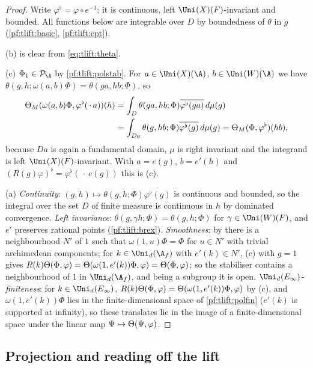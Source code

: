 \begin{proof}
Write $\varphi^\flat=\varphi\circ e^{-1}$; it is continuous, left $\Uni(X)(F)$-invariant and bounded. All functions below are
integrable over $D$ by boundedness of $\theta$ in $g$ (\cref{pf:tlift:basic}, \cref{pf:tlift:cpt}).

(b) is clear from \eqref{eq:tlift:theta}.

(c) $\Phi_1\in\tliftPD$ by \cref{pf:tlift:polstab}. For $a\in\Uni(X)(\A)$, $b\in\Uni(W)(\A)$ we have
$\theta(g,h;\omega(a,b)\Phi)=\theta(ga,hb;\Phi)$, so
\begin{align*}
  \Theta_M(\omega(a,b)\Phi,\varphi^\flat(\,\cdot\,a))(h)&=\int_D\theta(ga,hb;\Phi)\overline{\varphi^\flat(ga)}\,d\mu(g)\\
  &=\int_{Da}\theta(g,hb;\Phi)\overline{\varphi^\flat(g)}\,d\mu(g)=\Theta_M(\Phi,\varphi^\flat)(hb),
\end{align*}
because $Da$ is again a fundamental domain, $\mu$ is right invariant and the integrand is left
$\Uni(X)(F)$-invariant. With $a=e(g)$, $b=e'(h)$ and
$(R(g)\varphi)^\flat=\varphi^\flat(\,\cdot\,e(g))$ this is (c).

(a) \emph{Continuity}: $(g,h)\mapsto\theta(g,h;\Phi)\overline{\varphi^\flat(g)}$ is continuous and bounded, so the integral over the
set $D$ of finite measure is continuous in $h$ by dominated convergence. \emph{Left invariance}: $\theta(g,\gamma h;\Phi)=\theta(g,h;\Phi)$ for
$\gamma\in\Uni(W)(F)$, and $e'$ preserves rational points (\cref{pf:tlift:brex}). \emph{Smoothness}: by
 there is a neighbourhood $N'$ of $1$ such that $\omega(1,u)\Phi=\Phi$ for
$u\in N'$ with trivial archimedean components; for $k\in\Uni_d(\A_f)$ with $e'(k)\in N'$, (c) with $g=1$ gives
$R(k)\Theta(\Phi,\varphi)=\Theta(\omega(1,e'(k))\Phi,\varphi)=\Theta(\Phi,\varphi)$; so the stabiliser contains a
neighbourhood of $1$ in $\Uni_d(\A_f)$, and being a subgroup it is open. \emph{$\Uni_d(E_\infty)$-finiteness}: for
$k\in\Uni_d(E_\infty)$, $R(k)\Theta(\Phi,\varphi)=\Theta(\omega(1,e'(k))\Phi,\varphi)$ by (c), and $\omega(1,e'(k))\Phi$ lies in the
finite-dimensional space of \cref{pf:tlift:polfin} ($e'(k)$ is supported at infinity), so these translates lie
in the image of a finite-dimensional space under the linear map $\Psi\mapsto\Theta(\Psi,\varphi)$.
\end{proof}

\subsection{Projection and reading off the lift}\label{pf:tlift:read}

